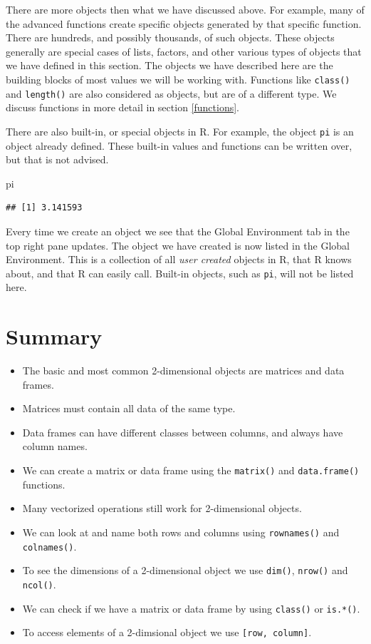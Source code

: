 \documentclass[
]{book}
\newenvironment{Shaded}{\begin{snugshade}}{\end{snugshade}}
\newcommand{\NormalTok}[1]{#1}
\begin{document}
There are more objects then what we have discussed above. For example, many of the advanced functions create specific objects generated by that specific function. There are hundreds, and possibly thousands, of such objects. These objects generally are special cases of lists, factors, and other various types of objects that we have defined in this section. The objects we have described here are the building blocks of most values we will be working with. Functions like \texttt{class()} and \texttt{length()} are also considered as objects, but are of a different type. We discuss functions in more detail in section \ref{functions}.

There are also built-in, or special objects in R. For example, the object \texttt{pi} is an object already defined. These built-in values and functions can be written over, but that is not advised.

\begin{Shaded}
\begin{Highlighting}[]
\NormalTok{pi}
\end{Highlighting}
\end{Shaded}

\begin{verbatim}
## [1] 3.141593
\end{verbatim}

Every time we create an object we see that the Global Environment tab in the top right pane updates. The object we have created is now listed in the Global Environment. This is a collection of all \emph{user created} objects in R, that R knows about, and that R can easily call. Built-in objects, such as \texttt{pi}, will not be listed here.

\hypertarget{summary-2}{%
\section*{Summary}\label{summary-2}}

\begin{itemize}
\item
  The basic and most common 2-dimensional objects are matrices and data frames.
\item
  Matrices must contain all data of the same type.
\item
  Data frames can have different classes between columns, and always have column names.
\item
  We can create a matrix or data frame using the \texttt{matrix()} and \texttt{data.frame()} functions.
\item
  Many vectorized operations still work for 2-dimensional objects.
\item
  We can look at and name both rows and columns using \texttt{rownames()} and \texttt{colnames()}.
\item
  To see the dimensions of a 2-dimensional object we use \texttt{dim()}, \texttt{nrow()} and \texttt{ncol()}.
\item
  We can check if we have a matrix or data frame by using \texttt{class()} or \texttt{is.*()}.
\item
  To access elements of a 2-dimsional object we use \texttt{{[}row,\ column{]}}.
\end{itemize}
\end{document}
